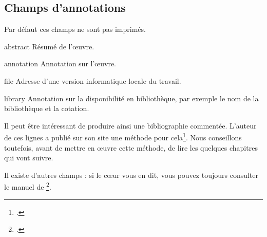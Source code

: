 \subsection{Champs d'annotations}

Par défaut ces champs ne sont pas imprimés. 

\begin{choix}
	\item[abstract] Résumé de l'œuvre. 
   	\item[annotation] Annotation sur l'œuvre.
   	\item[file] Adresse d'une version informatique locale du travail. 
   	\item[library] Annotation sur la disponibilité en bibliothèque, par exemple  le nom de la bibliothèque et la cotation.
\end{choix}

\begin{plusloins}
Il peut être intéressant de produire ainsi une bibliographie commentée. L'auteur de ces lignes a publié sur son site une méthode pour cela\footcite{biblio_commentee}. Nous conseillons toutefois, avant de mettre en œuvre cette méthode, de lire les quelques chapitres qui vont suivre.
\end{plusloins}

Il existe d'autres champs : si le cœur vous en dit, vous pouvez toujours consulter le manuel de \footcite{biblatex_champs}.
